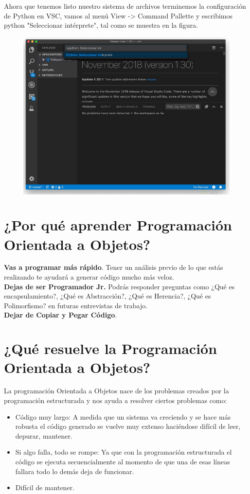 \documentclass{article}
\begin{document}
\newpage
Ahora que tenemos listo nuestro sistema de archivos terminemos la configuración
de Python en VSC, vamos al menú View -> Command Pallette y escribimos python
"Seleccionar intérprete", tal como se muestra en la figura.\\

\begin{figure}[h!]
  \centering
  \includegraphics[scale=0.75]{./Pictures/031_python_interprete.png}
\end{figure}

\section{¿Por qué aprender Programación Orientada a Objetos?}%
\textbf{Vas a programar más rápido}. Tener un análisis previo de lo que estás
realizando te ayudará a generar código mucho más veloz.\\
\textbf{Dejas de ser Programador Jr.} Podrás responder preguntas como ¿Qué es
encapsulamiento?, ¿Qué es Abstracción?, ¿Qué es Herencia?, ¿Qué es
Polimorfismo? en futuras entrevistas de trabajo.\\
\textbf{Dejar de Copiar y Pegar Código}.

\section{¿Qué resuelve la Programación Orientada a Objetos?}%
La programación Orientada a Objetos nace de los problemas creados por la
programación estructurada y nos ayuda a resolver ciertos problemas como:\\
\begin{itemize}
  \item Código muy largo: A medida que un sistema va creciendo y se hace más
    robusta el código generado se vuelve muy extenso haciéndose difícil de
    leer, depurar, mantener.
  \item Si algo falla, todo se rompe: Ya que con la programación estructurada
    el código se ejecuta secuencialmente al momento de que una de esas líneas
    fallara todo lo demás deja de funcionar.
  \item Difícil de mantener.
\end{itemize}
\end{document}
